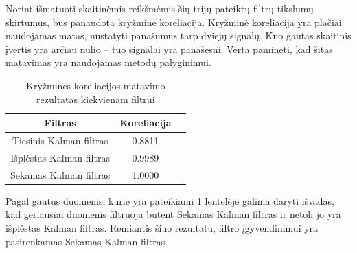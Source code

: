Norint išmatuoti skaitinėmis reikšmėmis šių trijų pateiktų filtrų tikslumų skirtumus, bus panaudota kryžminė koreliacija.
Kryžminė koreliacija yra plačiai naudojamas matas, nustatyti panašumus tarp dviejų signalų.
Kuo gautas skaitinis įvertis yra arčiau nulio -- tuo signalai yra panašesni.
Verta paminėti, kad šitas matavimas yra naudojamas metodų palyginimui.

\begin{table}
    \centering
    \caption{Kryžminės koreliacijos matavimo rezultatas kiekvienam filtrui}
    \label{table:kalman_filter_comparison}
    \begin{tabular}{|c|c|c|} \hline
        Filtras & Koreliacija \\ \hline
        Tiesinis Kalman filtras & 0.8811 \\ \hline
        Išplėstas Kalman filtras & 0.9989 \\ \hline
        Sekamas Kalman filtras & 1.0000 \\ \hline
    \end{tabular}
\end{table}

Pagal gautus duomenis, kurie yra pateikiami \ref{table:kalman_filter_comparison} lentelėje galima daryti išvadas, kad geriausiai duomenis filtruoja būtent Sekamas Kalman filtras ir netoli jo yra išplėstas Kalman filtras.
Remiantis šiuo rezultatu, filtro įgyvendinimui yra pasirenkamas Sekamas Kalman filtras.

